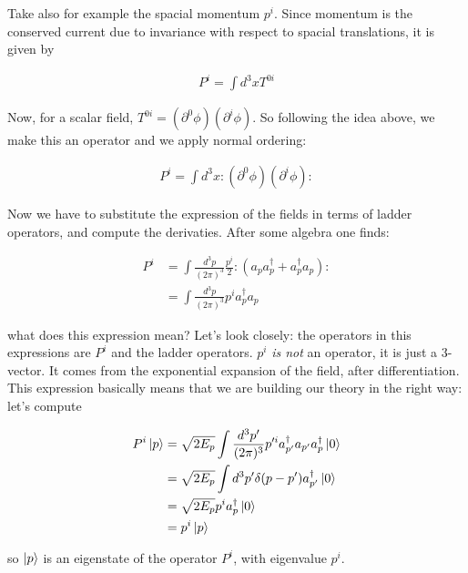 \documentclass{report}
\begin{document}
Take also for example the spacial momentum \(p^i\). Since momentum is the conserved current due to invariance with respect to spacial translations, it is given by 

\begin{align}
    P^i = \int d^3x T^{0i}
\end{align}

Now, for a scalar field, \(T^{0i} = (\partial^0 \phi)(\partial^i \phi)\). So following the idea above, we make this an operator and we apply normal ordering: 

\begin{align}
    P^i = \int d^3x :(\partial^0\phi)(\partial^i\phi):
\end{align}

Now we have to substitute the expression of the fields in terms of ladder operators, and compute the derivaties. After some algebra one finds: 

\begin{align}
    P^i &= \int \frac{d^3p}{(2\pi)^3} \frac{p^i}{2}:(a_pa_p^\dagger + a_p^\dagger a_p): \\
    &= \int \frac{d^3p}{(2\pi)^3}p^i a_p^\dagger a_p
\end{align}

what does this expression mean? Let's look closely: the operators in this expressions are \(P^i\) and the ladder operators. \(p^i\) \emph{is not} an operator, it is just a 3-vector. It comes from the exponential expansion of the field, after differentiation. This expression basically means that we are building our theory in the right way: let's compute 

\begin{align}
    P^i \ket{p} &= \sqrt{2E_p}\int \frac{d^3p'}{(2\pi)^3}p'^i a_{p'}^\dagger a_{p'}a_p^\dagger \ket{0} \\
    &= \sqrt{2E_p}\int d^3p' \delta(p-p') a^\dagger_{p'} \ket{0} \\
    &= \sqrt{2E_p}p^ia^\dagger_p \ket{0} \\
    &= p^i \ket{p}
\end{align}

so \(\ket{p}\) is an eigenstate of the operator \(P^i\), with eigenvalue \(p^i\). 

\end{document}
